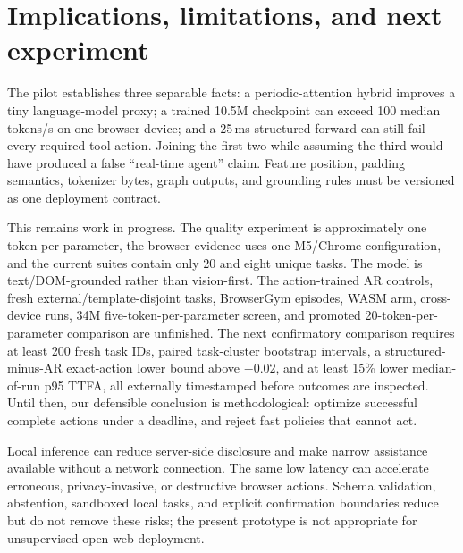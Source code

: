 \documentclass{article}
\begin{document}
\section{Implications, limitations, and next experiment}

The pilot establishes three separable facts: a periodic-attention hybrid improves a tiny
language-model proxy; a trained 10.5M checkpoint can exceed 100 median tokens/s on one browser
device; and a 25\,ms structured forward can still fail every required tool action.  Joining the
first two while assuming the third would have produced a false ``real-time agent'' claim.
Feature position, padding semantics, tokenizer bytes, graph outputs, and grounding rules must be
versioned as one deployment contract.

This remains work in progress.  The quality experiment is approximately one token per parameter,
the browser evidence uses one M5/Chrome configuration, and the current suites contain only 20 and
eight unique tasks.  The model is text/DOM-grounded rather than vision-first.  The action-trained
AR controls, fresh external/template-disjoint tasks, BrowserGym episodes, WASM arm, cross-device
runs, 34M five-token-per-parameter screen, and promoted 20-token-per-parameter comparison are
unfinished.  The next confirmatory comparison requires at least 200 fresh task IDs, paired
task-cluster bootstrap intervals, a structured-minus-AR exact-action lower bound above \(-0.02\),
and at least 15\% lower median-of-run p95 TTFA, all externally timestamped before outcomes are
inspected.  Until then, our defensible conclusion is methodological: optimize successful complete
actions under a deadline, and reject fast policies that cannot act.

Local inference can reduce server-side disclosure and make narrow assistance available without a
network connection.  The same low latency can accelerate erroneous, privacy-invasive, or
destructive browser actions.  Schema validation, abstention, sandboxed local tasks, and explicit
confirmation boundaries reduce but do not remove these risks; the present prototype is not
appropriate for unsupervised open-web deployment.





\end{document}
